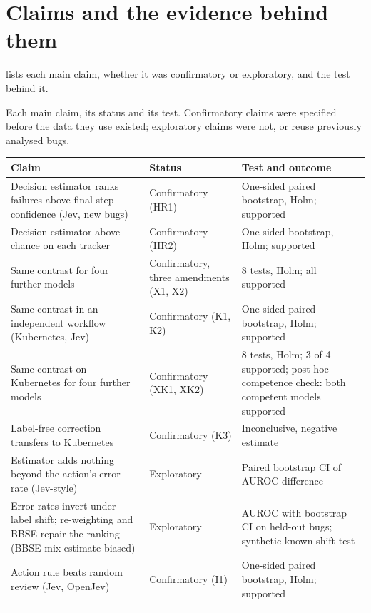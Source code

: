 \section{Claims and the evidence behind them}

 lists each main claim, whether it was confirmatory or
exploratory, and the test behind it.

\begin{widetable}
\centering
\caption{Each main claim, its status and its test. Confirmatory claims
were specified before the data they use existed; exploratory claims were
not, or reuse previously analysed bugs.}
\label{tab:claims}
\small
\begin{tabularx}{\linewidth}{Y l Y}
\toprule
Claim & Status & Test and outcome \\
\midrule
Decision estimator ranks failures above final-step confidence (Jev, new bugs) & Confirmatory (HR1) & One-sided paired bootstrap, Holm; supported \\ \addlinespace
Decision estimator above chance on each tracker & Confirmatory (HR2) & One-sided bootstrap, Holm; supported \\ \addlinespace
Same contrast for four further models & Confirmatory, three amendments (X1, X2) & 8 tests, Holm; all supported \\ \addlinespace
Same contrast in an independent workflow (Kubernetes, Jev) & Confirmatory (K1, K2) & One-sided paired bootstrap, Holm; supported \\ \addlinespace
Same contrast on Kubernetes for four further models & Confirmatory (XK1, XK2) & 8 tests, Holm; 3 of 4 supported; post-hoc competence check: both competent models supported \\ \addlinespace
Label-free correction transfers to Kubernetes & Confirmatory (K3) & Inconclusive, negative estimate \\ \addlinespace
Estimator adds nothing beyond the action's error rate (Jev-style) & Exploratory & Paired bootstrap CI of AUROC difference \\ \addlinespace
Error rates invert under label shift; re-weighting and BBSE repair the ranking (BBSE mix estimate biased) & Exploratory & AUROC with bootstrap CI on held-out bugs; synthetic known-shift test \\ \addlinespace
Action rule beats random review (Jev, OpenJev) & Confirmatory (I1) & One-sided paired bootstrap, Holm; supported \\ \addlinespace

\end{tabularx}
\end{widetable}
